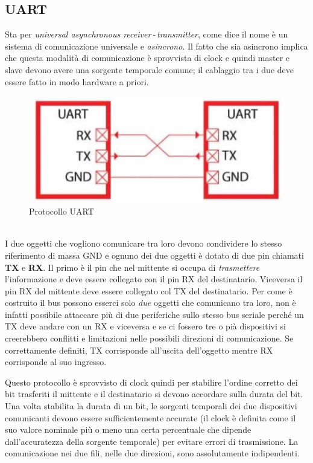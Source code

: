 \documentclass[12pt, a4paper]{report}
\begin{document}
\subsection{UART}
Sta per \textit{universal asynchronous receiver\,-\,transmitter}, come dice il nome è un sistema di comunicazione universale e \textit{asincrono}. Il fatto che sia asincrono implica che questa modalità di comunicazione è sprovvista di clock e quindi master e slave devono avere una sorgente temporale comune; il cablaggio tra i due deve essere fatto in modo hardware a priori.
\begin{figure}[h]
    \centering
    \includegraphics[scale=0.45,angle=0]{uart.png}
    \caption{Protocollo UART}
\end{figure}
\\I due oggetti che vogliono comunicare tra loro devono condividere lo stesso riferimento di massa GND e ognuno dei due oggetti è dotato di due pin chiamati \textbf{TX} e \textbf{RX}. Il primo è il pin che nel mittente si occupa di \textit{trasmettere} l'informazione e deve essere collegato con il pin RX del destinatario. Viceversa il pin RX del mittente deve essere collegato col TX del destinatario. Per come è costruito il bus possono esserci solo \textit{due} oggetti che comunicano tra loro, non è infatti possibile attaccare più di due periferiche sullo stesso bus seriale perché un TX deve andare con un RX e viceversa e se ci fossero tre o pià dispositivi si creerebbero conflitti e limitazioni nelle possibili direzioni di comunicazione. Se correttamente definiti, TX corrisponde all'uscita dell'oggetto mentre RX corrisponde al suo ingresso.

Questo protocollo è sprovvisto di clock quindi per stabilire l'ordine corretto dei bit trasferiti il mittente e il destinatario si devono accordare sulla durata del bit. Una volta stabilita la durata di un bit, le sorgenti temporali dei due dispositivi comunicanti devono essere sufficientemente accurate (il clock è definita come il suo valore nominale più o meno una certa percentuale che dipende dall'accuratezza della sorgente temporale) per evitare errori di trasmissione. La comunicazione nei due fili, nelle due direzioni, sono assolutamente indipendenti.
\end{document}
